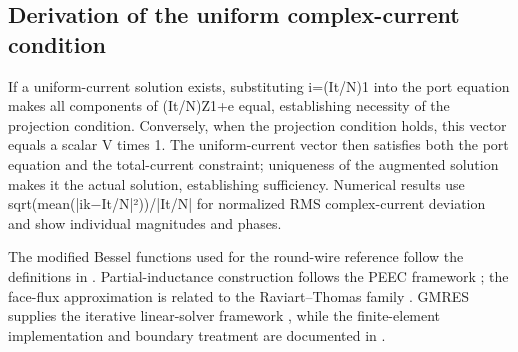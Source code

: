 \hypertarget{A.sharing_derivation.heading}{}
\subsection{Derivation of the uniform complex-current condition}

\hypertarget{A.sharing_derivation.p1}{}
If a uniform-current solution exists, substituting i=(It/N)1 into the port equation makes all components of (It/N)Z1+e equal, establishing necessity of the projection condition. Conversely, when the projection condition holds, this vector equals a scalar V times 1. The uniform-current vector then satisfies both the port equation and the total-current constraint; uniqueness of the augmented solution makes it the actual solution, establishing sufficiency. Numerical results use sqrt(mean(|ik−It/N|²))/|It/N| for normalized RMS complex-current deviation and show individual magnitudes and phases.

\hypertarget{A.method.sources}{}
The modified Bessel functions used for the round-wire reference follow the definitions in \cite{BESSEL}. Partial-inductance construction follows the PEEC framework \cite{RUEHLI1974}; the face-flux approximation is related to the Raviart–Thomas family \cite{RT1977}. GMRES supplies the iterative linear-solver framework \cite{GMRES1986}, while the finite-element implementation and boundary treatment are documented in \cite{FEMDOC}.
